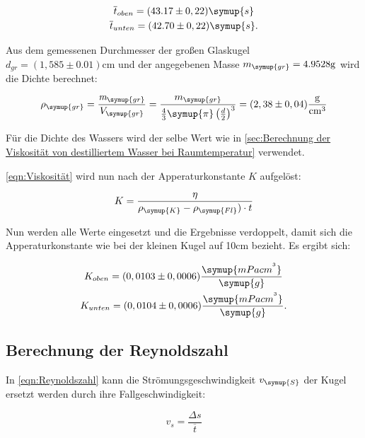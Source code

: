 \begin{gather}
  \overline{t}_{oben} = (43.17\pm0,22) \symup{s} \notag \\
  \overline{t}_{unten} = (42.70\pm0,22) \symup{s}  \notag .
\end{gather}

Aus dem gemessenen Durchmesser der großen Glaskugel $d_{gr}=(1,585\pm0.01) \unit{\centi\metre}$ und der angegebenen Masse
$m_{\symup{gr}}=4.9528\unit{\gram}$ wird die Dichte berechnet:

\begin{equation}
  \rho_{\symup{gr}}=\frac{\emph{m}_{\symup{gr}}}{V_{\symup{gr}}}=%
  \frac{m_{\symup{gr}}}{\frac{4}{3}\symup{\pi}\left(\frac{d}{2}\right)^3}=(2,38\pm0,04) \unit{\gram\per\cubic\centi\metre}
\end{equation}

Für die Dichte des Wassers wird der selbe Wert wie in \autoref{sec:Berechnung der Viskosität von destilliertem Wasser bei Raumtemperatur}
verwendet.

\autoref{eqn:Viskosität} wird nun nach der Apperaturkonstante $K$ aufgelöst:

\begin{equation}
  K=\frac{\eta}{\rho_{\symup{K}}-\rho_{\symup{Fl}})\cdot t}
\end{equation}

Nun werden alle Werte eingesetzt und die Ergebnisse verdoppelt, damit sich die Apperaturkonstante wie bei der kleinen
Kugel auf 10cm bezieht. Es ergibt sich:

\begin{gather}
  K_{oben} = (0,0103\pm0,0006) \frac{\symup{mPacm^{^{3}}}}{\symup{g}}  \notag \\
  K_{unten} = (0,0104\pm0,0006) \frac{\symup{mPacm^{^{3}}}}{\symup{g}}  \notag .
\end{gather}

\subsection{Berechnung der Reynoldszahl}
\label{sec:Berechnung der Reynoldszahl}

In \autoref{eqn:Reynoldszahl} kann die Strömungsgeschwindigkeit $v_{\symup{S}}$ der  Kugel ersetzt werden durch
ihre Fallgeschwindigkeit:

\begin{equation}
  v_{s}=\frac{\Delta s}{\overline{t}}
\end{equation}

